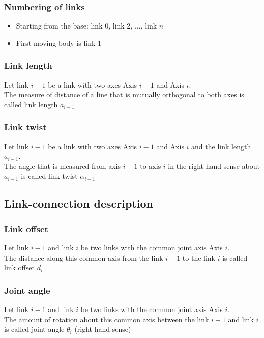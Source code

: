 \documentclass[10pt,a4paper]{article}
\begin{document}
\subsubsection{Numbering of links}
\begin{itemize}
	\item Starting from the base: link 0, link 2, $\dots$, link $n$
	\item First moving body is link 1
\end{itemize}

\subsubsection{Link length}
Let link $i-1$ be a link with two axes Axis $i-1$ and Axis $i$. \\
The measure of distance of a line that is mutually orthogonal to both axes is called link length $a_{i-1}$

\subsubsection{Link twist}
Let link $i-1$ be a link with two axes Axis $i-1$ and Axis $i$ and the link length $a_{i-1}$. \\
The angle that is measured from axis $i-1$ to axis $i$ in the right-hand sense about $a_{i-1}$ is called link twist $\alpha_{i-1}$

\subsection{Link-connection description}
\subsubsection{Link offset}
Let link $i-1$ and link $i$ be two links with the common joint axis Axis $i$. \\
The distance along this common axis from the link $i-1$ to the link $i$ is called link offset $d_i$ \\

\subsubsection{Joint angle}
Let link $i-1$ and link $i$ be two links with the common joint axis Axis $i$. \\
The amount of rotation about this common axis between the link $i-1$ and link $i$ is called joint angle $\theta_i$ (right-hand sense)
\end{document}
